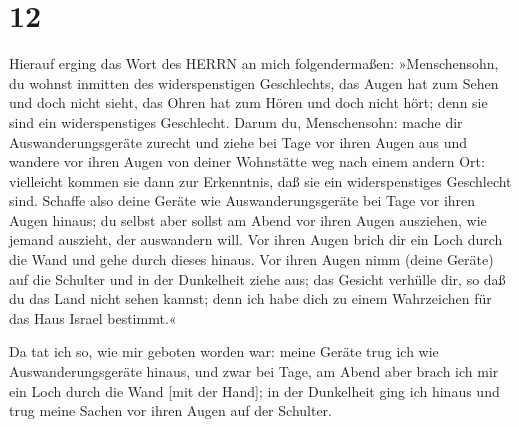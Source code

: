 \hypertarget{section-11}{%
\section{12}\label{section-11}}

Hierauf erging das Wort des HERRN an mich folgendermaßen:
»Menschensohn, du wohnst inmitten des widerspenstigen
Geschlechts, das Augen hat zum Sehen und doch nicht sieht, das Ohren hat
zum Hören und doch nicht hört; denn sie sind ein widerspenstiges
Geschlecht. Darum du, Menschensohn: mache dir
Auswanderungsgeräte zurecht und ziehe bei Tage vor ihren Augen aus und
wandere vor ihren Augen von deiner Wohnstätte weg nach einem andern Ort:
vielleicht kommen sie dann zur Erkenntnis, daß sie ein widerspenstiges
Geschlecht sind. Schaffe also deine Geräte wie
Auswanderungsgeräte bei Tage vor ihren Augen hinaus; du selbst aber
sollst am Abend vor ihren Augen ausziehen, wie jemand auszieht, der
auswandern will. Vor ihren Augen brich dir ein Loch durch
die Wand und gehe durch dieses hinaus. Vor ihren Augen
nimm (deine Geräte) auf die Schulter und in der Dunkelheit ziehe aus;
das Gesicht verhülle dir, so daß du das Land nicht sehen kannst; denn
ich habe dich zu einem Wahrzeichen für das Haus Israel bestimmt.«

Da tat ich so, wie mir geboten worden war: meine Geräte
trug ich wie Auswanderungsgeräte hinaus, und zwar bei Tage, am Abend
aber brach ich mir ein Loch durch die Wand {[}mit der Hand{]}; in der
Dunkelheit ging ich hinaus und trug meine Sachen vor ihren Augen auf der
Schulter.


